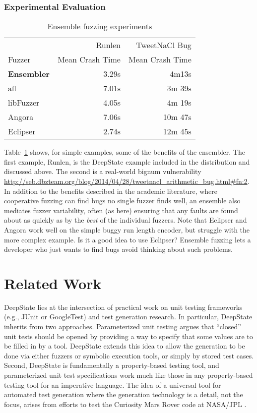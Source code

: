 \documentclass[sigconf]{acmart}
\begin{document}
\subsubsection{Experimental Evaluation}

\begin{table}
\centering
\begin{tabular}{l|r|r}
 & Runlen & TweetNaCl Bug \\
  Fuzzer & Mean Crash Time & Mean Crash Time \\
  \hline
  {\bf Ensembler} & 3.29s & 4m13s \\
  afl & 7.01s & 3m 39s \\
  libFuzzer & 4.05s & 4m 19s \\
  Angora & 7.06s & 10m 47s \\
  Eclipser & 2.74s & 12m 45s \\
\end{tabular}
\caption{Ensemble fuzzing experiments}
\label{tab:ensemble}
\end{table}

Table~\ref{tab:ensemble} shows, for simple examples, some of the benefits of the ensembler.  The first example, Runlen, is the DeepState example included in the distribution and discussed above.  The second is a real-world bignum vulnerability \url{http://seb.dbzteam.org/blog/2014/04/28/tweetnacl_arithmetic_bug.html\#fn:2}.  In addition to the benefits described in the academic literature, where cooperative fuzzing can find bugs no single fuzzer finds well, an ensemble also mediates fuzzer variability, often (as here) ensuring that any faults are found about as quickly as by the \emph{best} of the individual fuzzers.  Note that Eclipser and Angora work well on the simple buggy run length encoder, but struggle with the more complex example.  Is it a good idea to use Eclipser?  Ensemble fuzzing lets a developer who just wants to find bugs avoid thinking about such problems.

\section{Related Work}

DeepState lies at the intersection of practical work on unit testing frameworks (e.g., JUnit or GoogleTest) and test generation research.  In particular, DeepState inherits from two approaches.  Parameterized unit testing \cite{ParamUnit,UnitMeister} argues that ``closed'' unit tests should be opened by providing a way to specify that some values are to be filled in by a tool.  DeepState extends this idea to allow the generation to be done via either fuzzers or symbolic execution tools, or simply by stored test cases.  Second, DeepState is fundamentally a property-based testing \cite{ClaessenH00,Hypothesis}  tool, and parameterized unit test specifications work much like those in any property-based testing tool for an imperative language.  The idea of a universal tool for automated test generation where the generation technology is a detail, not the focus, arises from efforts to test the Curiosity Mars Rover code at NASA/JPL \cite{AMAI,WODACommon,WODA08}.
\end{document}

